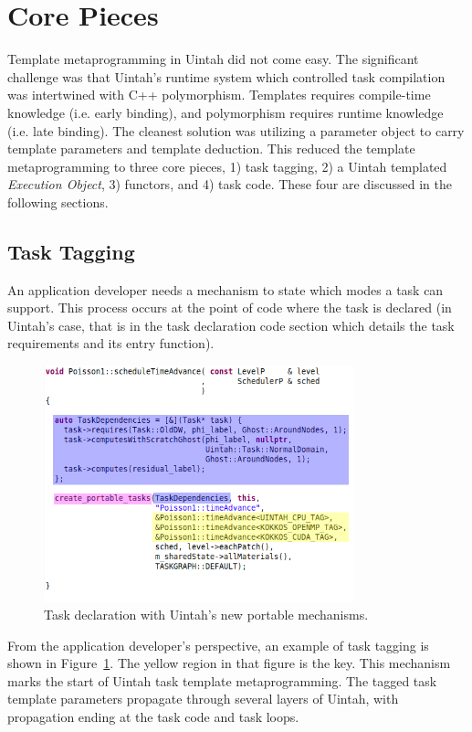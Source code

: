 \documentclass[]{article}
\begin{document}
\section{Core Pieces}

Template metaprogramming in Uintah did not come easy.  The significant challenge was that Uintah's runtime system which controlled task compilation was intertwined with C++ polymorphism.  Templates requires compile-time knowledge (i.e. early binding), and polymorphism requires runtime knowledge (i.e. late binding).  The cleanest solution was utilizing a parameter object to carry template parameters and template deduction.  This reduced the template metaprogramming to three core pieces, 1) task tagging, 2) a Uintah templated \emph{Execution Object}, 3) functors, and 4) task code.  These four are discussed in the following sections.

\subsection{Task Tagging}
\label{sec:task_tagging}
An application developer needs a mechanism to state which modes a task can support.  This process occurs at the point of code where the task is declared (in Uintah's case, that is in the task declaration code section which details the task requirements and its entry function).  

\begin{figure}[h]
	\centerline{
		\includegraphics[width=0.8\textwidth,draft=false]{figures/poissonTaskAfter.png}
	}
	\caption{Task declaration with Uintah's new portable mechanisms.} 
	\label{fig:poisson_task_after}
\end{figure}

From the application developer's perspective, an example of task tagging is shown in Figure~\ref{fig:poisson_task_after}.  The yellow region in that figure is the key.  This mechanism marks the start of Uintah task template metaprogramming.   The tagged task template parameters propagate through several layers of Uintah, with propagation ending at the task code and task loops.  
\end{document}
